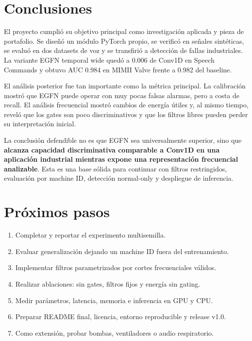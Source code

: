 \documentclass[11pt,a4paper]{article}
\begin{document}
\section{Conclusiones}

El proyecto cumplió su objetivo principal como investigación aplicada y pieza
de portafolio. Se diseñó un módulo PyTorch propio, se verificó en señales
sintéticas, se evaluó en dos datasets de voz y se transfirió a detección de
fallas industriales. La variante EGFN temporal wide quedó a 0.006 de Conv1D en
Speech Commands y obtuvo AUC 0.984 en MIMII Valve frente a 0.982 del baseline.

El análisis posterior fue tan importante como la métrica principal. La
calibración mostró que EGFN puede operar con muy pocas falsas alarmas, pero a
costa de recall. El análisis frecuencial mostró cambios de energía útiles y, al
mismo tiempo, reveló que los gates son poco discriminativos y que los filtros
libres pueden perder su interpretación inicial.

La conclusión defendible no es que EGFN sea universalmente superior, sino que
\textbf{alcanza capacidad discriminativa comparable a Conv1D en una aplicación
industrial mientras expone una representación frecuencial analizable}. Esta es
una base sólida para continuar con filtros restringidos, evaluación por
machine ID, detección normal-only y despliegue de inferencia.

\section{Próximos pasos}

\begin{enumerate}
  \item Completar y reportar el experimento multisemilla.
  \item Evaluar generalización dejando un machine ID fuera del entrenamiento.
  \item Implementar filtros parametrizados por cortes frecuenciales válidos.
  \item Realizar ablaciones: sin gates, filtros fijos y energía sin gating.
  \item Medir parámetros, latencia, memoria e inferencia en GPU y CPU.
  \item Preparar README final, licencia, entorno reproducible y release v1.0.
  \item Como extensión, probar bombas, ventiladores o audio respiratorio.
\end{enumerate}
\end{document}
